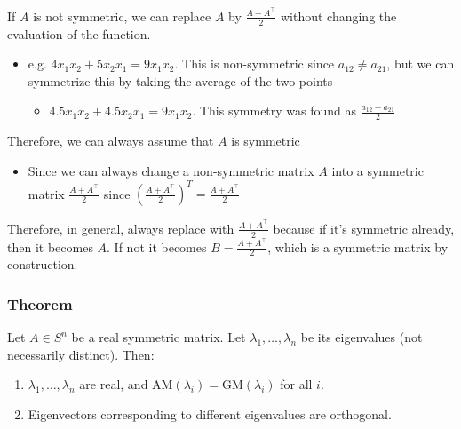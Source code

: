 \begin{warning}
    If \(A\) is not symmetric, we can replace \(A\) by \( \frac{A + A^\top}{2} \) without changing the evaluation of the function.

    \begin{itemize}
        \item e.g. \(4  x_1 x_2 + 5 x_2 x_1 = 9 x_1 x_ 2\). This is non-symmetric since $a_{12} \neq a_{21}$, but we can symmetrize this by taking the average of the two points 
        \begin{itemize}
            \item $4.5 x_1 x_2 + 4.5 x_2 x_1 = 9 x_1 x_2$. This symmetry was found as $\frac{a_{12} + a_{21}}{2}$
        \end{itemize}
    \end{itemize}
    \vspace{1em}

    Therefore, we can always assume that \(A\) is symmetric 
    \begin{itemize}
        \item Since we can always change a non-symmetric matrix $A$ into a symmetric matrix \( \frac{A + A^\top}{2} \) since \( \left(\frac{A + A^\top}{2}\right)^T =\frac{A + A^\top}{2} \)
    \end{itemize}
    \vspace{1em}

    Therefore, in general, always replace with \( \frac{A + A^\top}{2} \) because if it's symmetric already, then it becomes $A$. If not it becomes $B=\frac{A + A^\top}{2}$, which is a symmetric matrix by construction.
\end{warning}

\subsubsection{Theorem}

\begin{theorem}
    Let $A \in S^n$ be a real symmetric matrix. Let $\lambda_1, \dots, \lambda_n$ be its eigenvalues (not necessarily distinct). Then:
    \begin{enumerate}
        \item $\lambda_1, \dots, \lambda_n$ are real, and $\text{AM}(\lambda_i) = \text{GM}(\lambda_i)$ for all $i$.
        \item Eigenvectors corresponding to different eigenvalues are orthogonal.
    \end{enumerate}
\end{theorem}

